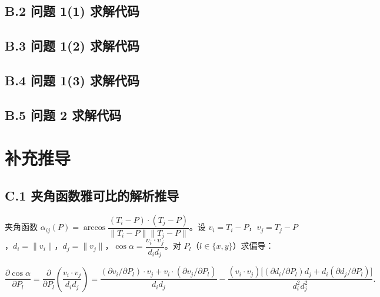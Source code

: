 \documentclass[12pt,a4paper]{ctexart}
\begin{document}


\subsection*{B.2 问题 1(1) 求解代码}



\subsection*{B.3 问题 1(2) 求解代码}



\subsection*{B.4 问题 1(3) 求解代码}



\subsection*{B.5 问题 2 求解代码}



\section{补充推导}

\subsection*{C.1 夹角函数雅可比的解析推导}

夹角函数 $\alpha_{ij}(P)=\arccos\dfrac{(T_i-P)\cdot(T_j-P)}{\|T_i-P\|\|T_j-P\|}$。设 $v_i=T_i-P$，$v_j=T_j-P$，$d_i=\|v_i\|$，$d_j=\|v_j\|$，$\cos\alpha=\dfrac{v_i\cdot v_j}{d_i d_j}$。对 $P_l$（$l\in\{x,y\}$）求偏导：

\begin{equation}
\frac{\partial\cos\alpha}{\partial P_l}=\frac{\partial}{\partial P_l}\!\left(\frac{v_i\cdot v_j}{d_i d_j}\right)=\frac{(\partial v_i/\partial P_l)\cdot v_j+v_i\cdot(\partial v_j/\partial P_l)}{d_i d_j}-\frac{(v_i\cdot v_j)\bigl[(\partial d_i/\partial P_l)d_j+d_i(\partial d_j/\partial P_l)\bigr]}{d_i^2 d_j^2}.
\label{eq:deriv-cos}
\end{equation}
\end{document}
